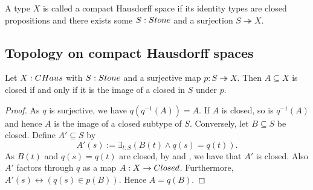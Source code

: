 \begin{definition}
  A type $X$ is called a compact Hausdorff space if its identity types are closed propositions and there exists some $S:\Stone$ and a surjection $S\twoheadrightarrow X$.
\end{definition}


\subsection{Topology on compact Hausdorff spaces}

\begin{lemma}\label{CompactHausdorffClosed}
  Let $X:\CHaus$ with $S:\Stone$ and a surjective map $p:S\twoheadrightarrow X$.
  Then $A\subseteq X$ is closed if and only if it is the image of a closed in $S$ under $p$. 
\end{lemma}
\begin{proof}
  As $q$ is surjective, we have $q(q^{-1}(A)) = A$.
  If $A$ is closed, so is $q^{-1}(A)$ and 
  hence $A$ is the image of a closed subtype of $S$. 
  Conversely, let $B\subseteq S$ be closed. 
  Define $A'\subseteq S$ by 
  $$A'(s) := \exists_{t:S} (B(t) \wedge q(s) = q(t)).$$
  As $B(t)$ and $q(s) = q(t)$ are closed, by  and , 
  we have that $A'$ is closed. 
  Also $A'$ factors through $q$ as a map $A: X\to \Closed$.
  Furthermore, $A'(s) \leftrightarrow (q(s)\in p(B))$. 
  Hence $A=q(B)$. 
\end{proof}

